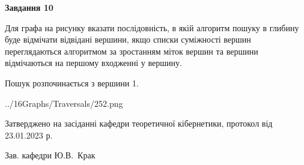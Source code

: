 \documentclass[12pt, ukrainian]{article}
\begin{document}
{\begin {large}
{\begin {center}\textbf{Завдання 10}\end {center}}\par
Для графа на рисунку вказати послідовність, в якій алгоритм пошуку в глибину буде відмічати відвідані вершини, якщо списки суміжності вершин переглядаються алгоритмом за зростанням міток вершин та вершини відмічаються на першому вход\-женні у вершину.\par
Пошук розпочинається з вершини 1.\par

\begin{center}
	{../16Graphs/Traversals/252.png}
\end{center}\par
\newpage


\end {large}
}
{\smallskip \begin {small} Затверджено на засіданні кафедри теоретичної кібернетики, протокол  від   23.01.2023 р.\par\smallskip\smallskip
{\parbox {6.5 cm}{Зав. кафедри \dotfill Ю.В.~Крак}} \end{small}}
\end{document}
